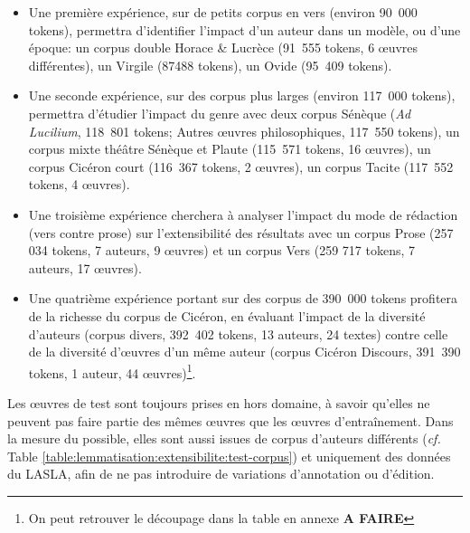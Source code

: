 \begin{itemize}
    \item Une première expérience, sur de petits corpus en vers (environ 90~000 tokens), permettra d'identifier l'impact d'un auteur dans un modèle, ou d'une époque: un corpus double Horace \& Lucrèce (91~555 tokens, 6 œuvres différentes), un Virgile (87488 tokens), un Ovide (95~409 tokens).
    \item Une seconde expérience, sur des corpus plus larges (environ 117~000 tokens), permettra d'étudier l'impact du genre avec deux corpus Sénèque (\textit{Ad Lucilium}, 118~801 tokens; Autres œuvres philosophiques, 117~550 tokens), un corpus mixte théâtre Sénèque et Plaute (115~571 tokens, 16 œuvres), un corpus Cicéron court (116~367 tokens, 2 œuvres), un corpus Tacite (117~552 tokens, 4 œuvres).
    \item Une troisième expérience cherchera à analyser l'impact du mode de rédaction (vers contre prose) sur l'extensibilité des résultats avec un corpus Prose (257 034 tokens, 7 auteurs, 9 œuvres) et un corpus Vers (259 717 tokens, 7 auteurs, 17 œuvres).
    \item Une quatrième expérience portant sur des corpus de 390~000 tokens profitera de la richesse du corpus de Cicéron, en évaluant l'impact de la diversité d'auteurs (corpus divers, 392~402 tokens, 13 auteurs, 24 textes) contre celle de la diversité d'œuvres d'un même auteur (corpus Cicéron Discours, 391~390 tokens, 1 auteur, 44 œuvres)\footnote{On peut retrouver le découpage dans la table en annexe \textbf{A FAIRE}}.
\end{itemize}{}

Les œuvres de test sont toujours prises en hors domaine, à savoir qu'elles ne peuvent pas faire partie des mêmes œuvres que les œuvres d'entraînement. Dans la mesure du possible, elles sont aussi issues de corpus d'auteurs différents (\textit{cf.} Table \ref{table:lemmatisation:extensibilite:test-corpus}) et uniquement des données du LASLA, afin de ne pas introduire de variations d'annotation ou d'édition.

